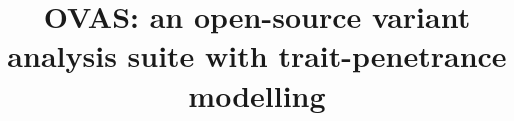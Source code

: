\documentclass[twocolumn]{bmcart}%
\def\app{OVAS}
\begin{document}
\begin{frontmatter}

\begin{fmbox}


\title{\app{}: an open-source variant analysis suite with trait-penetrance modelling}


\author[
   addressref={aff1},                   %
   email={},   							%
   noteref={n1}
]{\inits{} }
\author[
   addressref={aff1},
   email={m.tekman@ucl.ac.uk},
   noteref={n1}
]{\inits{} }
\author[
   addressref={aff2},
   email={}
]{ }
\author[
   addressref={aff1},
   email={}
]{\inits{} }
\author[
   addressref={aff1},
      corref={aff1},
   email={r.kleta@ucl.ac.uk}
]{\inits{} }
\author[
   addressref={aff1},
   email={h.stanescu@ucl.ac.uk}
]{\inits{} }

 
\address[id=aff1]{%
  , %
  ,                              %
}
\address[id=aff2]{%
  ,
  ,
}


\end{fmbox}
\end{frontmatter}
\end{document}
